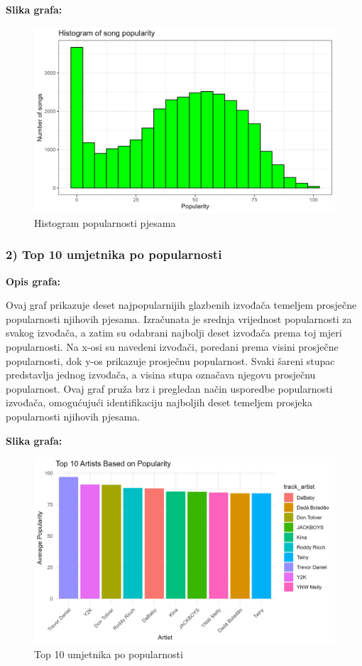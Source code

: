 	\textbf{Slika grafa:}
	\begin{figure}[H]
		\includegraphics[scale=0.9]{slike/Histogram of song popularity.png}
		\centering
		\caption{Histogram popularnosti pjesama}
		
	\end{figure}

	\subsubsection{2) Top 10 umjetnika po popularnosti}
	
	\textbf{Opis grafa:}
	
	Ovaj graf prikazuje deset najpopularnijih glazbenih izvođača temeljem prosječne popularnosti njihovih pjesama. Izračunata je srednja vrijednost popularnosti za svakog izvođača, a zatim su odabrani najbolji deset izvođača prema toj mjeri popularnosti.
	Na x-osi su navedeni izvođači, poredani prema visini prosječne popularnosti, dok y-os prikazuje prosječnu popularnost. Svaki šareni stupac predstavlja jednog izvođača, a visina stupa označava njegovu prosječnu popularnost.
	Ovaj graf pruža brz i pregledan način usporedbe popularnosti izvođača, omogućujući identifikaciju najboljih deset temeljem prosjeka popularnosti njihovih pjesama.
	
	\textbf{Slika grafa:}
	\begin{figure}[H]
		\includegraphics[scale=0.9]{slike/Top 10 popularity}
		\centering
		\caption{Top 10 umjetnika po popularnosti}
		
	\end{figure}


